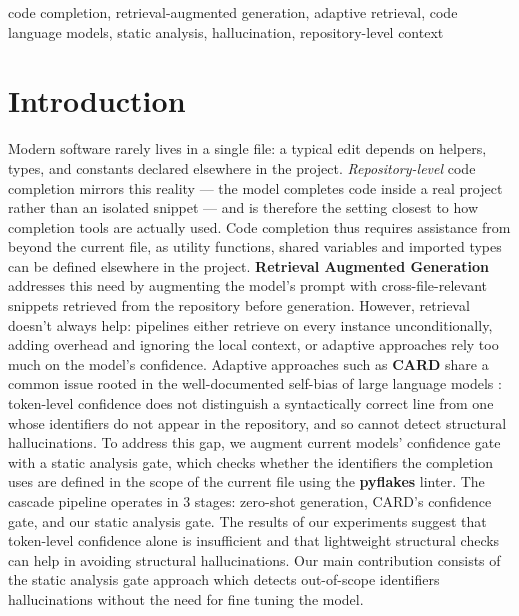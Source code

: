 \documentclass[10pt,conference]{IEEEtran}
\newcommand{\rev}[1]{{\color{red}#1}}
\newcommand{\new}[1]{{\color{blue}#1}}
\newcommand{\ugr}[1]{{\color{revgreen}#1}}
\begin{document}
\begin{IEEEkeywords}
\rev{code completion, retrieval-augmented generation, adaptive retrieval, code
language models, static analysis, hallucination, repository-level context}
\end{IEEEkeywords}

\section{Introduction}
\ugr{Modern software rarely lives in a single file: a typical edit depends on
helpers, types, and constants declared elsewhere in the project.
\emph{Repository-level} code completion mirrors this reality --- the model
completes code inside a real project rather than an isolated snippet --- and is
therefore the setting closest to how completion tools are actually used.}
Code completion \ugr{thus} requires assistance from beyond the current file, as utility functions, shared variables and imported types can be defined elsewhere in the project. \textbf{Retrieval Augmented Generation} \cite{lewis2021retrievalaugmentedgenerationknowledgeintensivenlp} addresses this \ugr{need} by augmenting the model's prompt with cross-file-relevant snippets retrieved from the repository before generation. However, retrieval doesn't always help: pipelines either retrieve on every instance unconditionally, adding overhead and ignoring the local context, or adaptive approaches rely too much on the model's confidence. Adaptive approaches such as \textbf{CARD} \cite{zhang2024card} share a common issue rooted in the well-documented self-bias of large language models \cite{xu-etal-2024-pride}: token-level confidence does not distinguish a \ugr{syntactically} correct line from one whose identifiers do not appear in the repository, and so cannot detect structural hallucinations.  To address this gap,  we augment current models' confidence gate with a static analysis gate, which checks whether \new{the identifiers the completion uses are defined in the scope of the current file using the \textbf{pyflakes} linter}. The cascade pipeline operates in 3 stages: zero-shot generation, CARD's confidence gate, and our static analysis gate. The results of our experiments suggest that token-level confidence alone is insufficient and that lightweight structural checks can help in avoiding structural hallucinations. Our main contribution consists of  the static analysis gate approach which detects out-of-scope identifiers hallucinations without the need for fine tuning the model.
\iffalse
\end{document}
